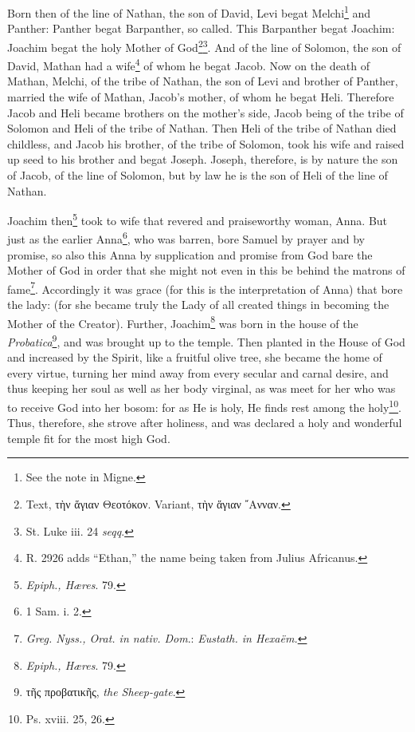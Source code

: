Born then of the line of Nathan, the son of David, Levi begat Melchi\footnote{See the note in Migne.} and Panther: Panther begat Barpanther, so called. This Barpanther begat Joachim: Joachim begat the holy Mother of God\footnote{Text, \textgreek{τὴν ἅγιαν Θεοτόκον}. Variant, \textgreek{τὴν ἅγιαν ῎Ανναν}.}\textsuperscript{}\footnote{St. Luke iii. 24 \emph{seqq}.}\textsuperscript{}. And of the line of Solomon, the son of David, Mathan had a wife\footnote{R. 2926 adds “Ethan,” the name being taken from Julius Africanus.} of whom he begat Jacob. Now on the death of Mathan, Melchi, of the tribe of Nathan, the son of Levi and brother of Panther, married the wife of Mathan, Jacob’s mother, of whom he begat Heli. Therefore Jacob and Heli became brothers on the mother’s side, Jacob being of the tribe of Solomon and Heli of the tribe of Nathan. Then Heli of the tribe of Nathan died childless, and Jacob his brother, of the tribe of Solomon, took his wife and raised up seed to his brother and begat Joseph. Joseph, therefore, is by nature the son of Jacob, of the line of Solomon, but by law he is the son of Heli of the line of Nathan.

Joachim then\footnote{\emph{Epiph., Hæres}. 79.} took to wife that revered and praiseworthy woman, Anna. But just as the earlier Anna\footnote{1 Sam. i. 2.}, who was barren, bore Samuel by prayer and by promise, so also this Anna by supplication and promise from God bare the Mother of God in order that she might not even in this be behind the matrons of fame\footnote{\emph{Greg. Nyss., Orat. in nativ. Dom}.: \emph{Eustath. in Hexaëm.}}. Accordingly it was grace (for this is the interpretation of Anna) that bore the lady: (for she became truly the Lady of all created things in becoming the Mother of the Creator). Further, Joachim\footnote{\emph{Epiph., Hæres}. 79.} was born in the house of the \emph{Probatica}\footnote{\textgreek{τῆς προβατικῆς}, \emph{the Sheep-gate}.}, and was brought up to the temple. Then planted in the House of God and increased by the Spirit, like a fruitful olive tree, she became the home of every virtue, turning her mind away from every secular and carnal desire, and thus keeping her soul as well as her body virginal, as was meet for her who was to receive God into her bosom: for as He is holy, He finds rest among the holy\footnote{Ps. xviii. 25, 26.}. Thus, therefore, she strove after holiness, and was declared a holy and wonderful temple fit for the most high God.

